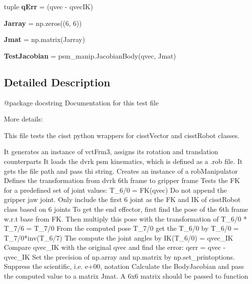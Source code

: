 \begin{DoxyCompactItemize}
\item 
tuple {\bfseries q\+Err} = (qvec -\/ qvec\+IK)\hypertarget{namespacecisstPythonTest_a1fb19480b440c07e9e3ee948701d1ee3}{}\label{namespacecisstPythonTest_a1fb19480b440c07e9e3ee948701d1ee3}

\item 
{\bfseries Jarray} = np.\+zeros((6, 6))\hypertarget{namespacecisstPythonTest_a1fcf7802f505257db56e8bf070847848}{}\label{namespacecisstPythonTest_a1fcf7802f505257db56e8bf070847848}

\item 
{\bfseries Jmat} = np.\+matrix(Jarray)\hypertarget{namespacecisstPythonTest_a7f36aa8181a55a80ea1660f3f7585d35}{}\label{namespacecisstPythonTest_a7f36aa8181a55a80ea1660f3f7585d35}

\item 
{\bfseries Test\+Jacobian} = psm\+\_\+manip.\+Jacobian\+Body(qvec, Jmat)\hypertarget{namespacecisstPythonTest_a3088e2ac3d5a126106f751c351e8a4f9}{}\label{namespacecisstPythonTest_a3088e2ac3d5a126106f751c351e8a4f9}

\end{DoxyCompactItemize}


\subsection{Detailed Description}
\begin{DoxyVerb}@package docstring
Documentation for this test file

More details:

This file tests the cisst python wrappers for cisstVector and cisstRobot classes.

It generates an instance of vctFrm3, assigns its rotation and translation counterparts
It loads the dvrk psm kinematics, which is defined as a .rob file. It gets the file path and pass thi string.
Creates an instance of a robManipulator
Defines the transformation from dvrk 6th frame to gripper frame
Tests the FK for a predefined set of joint values: T_6/0 = FK(qvec)
Do not append the gripper jaw joint. Only include the first 6 joint as the FK and IK of cisstRobot class based on 6 joints
To get the end effector, first find the pose of the 6th frame w.r.t base from FK. Then multiply this pose with the transformation of T_6/0 * T_7/6 = T_7/0
From the computed pose T_7/0 get the T_6/0 by T_6/0 = T_7/0*inv(T_6/7)
The compute the joint angles by IK(T_6/0) = qvec_IK
Compare qvec_IK with the original qvec and find the error: qerr = qvec - qvec_IK
Set the precision of np.array and np.matrix by np.set_printoptions. Suppress the scientific, i.e. e+00, notation
Calculate the BodyJacobian and pass the computed value to a matrix Jmat. A 6x6 matrix should be passed to function\end{DoxyVerb}
 

